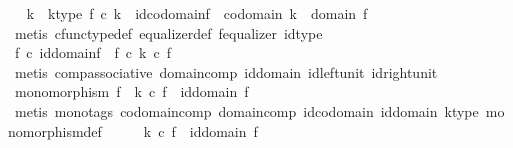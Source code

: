 \begin{isabellebody}
\ \isamarkupfalse%
\ k\ \ k{\isacharunderscore}{\kern0pt}type{\isacharcolon}{\kern0pt}\ {\isachardoublequoteopen}f\ {\isasymcirc}\isactrlsub c\ k\ {\isacharequal}{\kern0pt}\ id{\isacharparenleft}{\kern0pt}codomain{\isacharparenleft}{\kern0pt}f{\isacharparenright}{\kern0pt}{\isacharparenright}{\kern0pt}\ {\isasymand}\ codomain\ k\ {\isacharequal}{\kern0pt}\ domain\ f{\isachardoublequoteclose}\isanewline
\ \ \ \ \isamarkupfalse%
\ {\isacharparenleft}{\kern0pt}metis\ cfunc{\isacharunderscore}{\kern0pt}type{\isacharunderscore}{\kern0pt}def\ equalizer{\isacharunderscore}{\kern0pt}def\ f{\isacharunderscore}{\kern0pt}equalizer\ id{\isacharunderscore}{\kern0pt}type{\isacharparenright}{\kern0pt}\isanewline
\ \ \isamarkupfalse%
\ \isamarkupfalse%
\ {\isachardoublequoteopen}f\ {\isasymcirc}\isactrlsub c\ id{\isacharparenleft}{\kern0pt}domain{\isacharparenleft}{\kern0pt}f{\isacharparenright}{\kern0pt}{\isacharparenright}{\kern0pt}\ {\isacharequal}{\kern0pt}\ f\ {\isasymcirc}\isactrlsub c\ {\isacharparenleft}{\kern0pt}k\ {\isasymcirc}\isactrlsub c\ f{\isacharparenright}{\kern0pt}{\isachardoublequoteclose}\isanewline
\ \ \ \ \isamarkupfalse%
\ {\isacharparenleft}{\kern0pt}metis\ comp{\isacharunderscore}{\kern0pt}associative\ domain{\isacharunderscore}{\kern0pt}comp\ id{\isacharunderscore}{\kern0pt}domain\ id{\isacharunderscore}{\kern0pt}left{\isacharunderscore}{\kern0pt}unit\ id{\isacharunderscore}{\kern0pt}right{\isacharunderscore}{\kern0pt}unit{\isacharparenright}{\kern0pt}\isanewline
\ \ \isamarkupfalse%
\ \isamarkupfalse%
\ {\isachardoublequoteopen}monomorphism\ f\ {\isasymLongrightarrow}\ k\ {\isasymcirc}\isactrlsub c\ f\ {\isacharequal}{\kern0pt}\ id{\isacharparenleft}{\kern0pt}domain\ f{\isacharparenright}{\kern0pt}{\isachardoublequoteclose}\isanewline
\ \ \ \ \isamarkupfalse%
\ {\isacharparenleft}{\kern0pt}metis\ {\isacharparenleft}{\kern0pt}mono{\isacharunderscore}{\kern0pt}tags{\isacharparenright}{\kern0pt}\ codomain{\isacharunderscore}{\kern0pt}comp\ domain{\isacharunderscore}{\kern0pt}comp\ id{\isacharunderscore}{\kern0pt}codomain\ id{\isacharunderscore}{\kern0pt}domain\ k{\isacharunderscore}{\kern0pt}type\ monomorphism{\isacharunderscore}{\kern0pt}def{\isacharparenright}{\kern0pt}\isanewline
\ \ \isamarkupfalse%
\ \isamarkupfalse%
\ {\isachardoublequoteopen}k\ {\isasymcirc}\isactrlsub c\ f\ {\isacharequal}{\kern0pt}\ id{\isacharparenleft}{\kern0pt}domain\ f{\isacharparenright}{\kern0pt}{\isachardoublequoteclose}\isanewline

\end{isabellebody}
